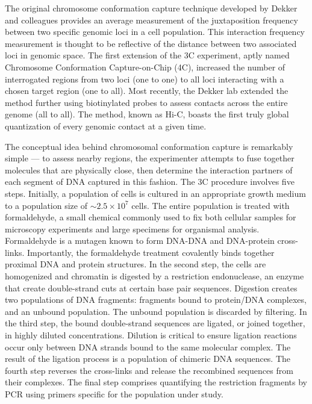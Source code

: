 \documentclass[phd,tocprelim]{cornell}
\begin{document}
The original chromosome conformation capture technique developed by Dekker and
colleagues provides an average measurement of the juxtaposition frequency between
two specific genomic loci in a cell population\cite{frase2014}.  This
interaction frequency measurement is thought to be reflective of the distance
between two associated loci in genomic space.  The first extension of the 3C
experiment, aptly named Chromosome Conformation Capture-on-Chip (4C), increased
the number of interrogated regions from two loci (one to one) to all loci
interacting with a chosen target region (one to all)\cite{simonis2006}.  Most
recently, the Dekker lab extended the method further using biotinylated probes
to assess contacts across the entire genome (all to all)\cite{berkum2010}.
The method, known as Hi-C, boasts the first truly global quantization of every
genomic contact at a given time.

The conceptual idea behind chromosomal conformation capture is remarkably
simple --- to assess nearby regions, the experimenter attempts to fuse
together molecules that are physically close, then determine the interaction
partners of each segment of DNA captured in this fashion.  The 3C procedure
involves five steps.   Initially, a population of cells is cultured in an appropriate
growth medium to a population size of $\sim2.5 \times 10^7$ cells\cite{berkum2010}.
The entire population is treated with formaldehyde, a small chemical commonly
used to fix both cellular samples for microscopy experiments and large specimens
for organismal analysis.  Formaldehyde is a mutagen known to form DNA-DNA and
DNA-protein cross-links\cite{merk1998}.  Importantly, the formaldehyde
treatment covalently binds together proximal DNA and protein structures.
In the second step, the cells are homogenized and chromatin is digested by a
restriction endonuclease, an enzyme that create double-strand cuts at certain
base pair sequences\cite{berkum2010}.  Digestion creates two populations of
DNA fragments: fragments bound to protein/DNA complexes, and an unbound
population.  The unbound population is discarded by filtering.  In the
third step, the bound double-strand sequences are ligated, or joined together,
in highly diluted concentrations. Dilution is critical to ensure ligation
reactions occur only between DNA strands bound to the same molecular complex.
The result of the ligation process is a population of chimeric DNA sequences.
The fourth step reverses the cross-links and release the recombined sequences
from their complexes.  The final step comprises quantifying the restriction
fragments by PCR using primers specific for the population under
study\cite{simonis2007}.
\end{document}
